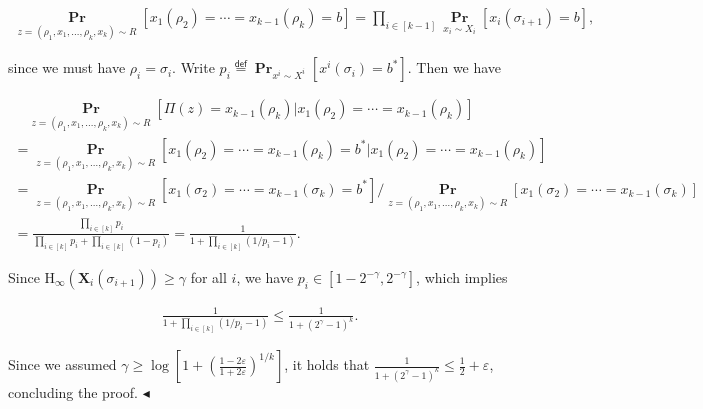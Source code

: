 \[\begin{gathered}
\operatorname*{\mathbf{Pr}}_{z=(\rho_{1},x_{1},\dots,\rho_{k},x_{k})\sim R}\left[x_{1}(\rho_{2})=\cdots=x_{k-1}(\rho_{k})=b\right]=\prod_{i\in[k-1]}\operatorname*{\mathbf{Pr}}_{x_{i}\sim X_{i}}\left[x_{i}(\sigma_{i+1})=b\right],
\end{gathered}\]


since we must have $\rho_{i}=\sigma_{i}$.
Write $p_{i}\stackrel{{\scriptstyle\mathsf{def}}}{{=}}\operatorname*{\mathbf{Pr}}_{x^{i}\sim X^{i}}\left[x^{i}(\sigma_{i})=b^{*}\right]$.
Then we have\par




\[\begin{gathered}
\displaystyle\quad\operatorname*{\mathbf{Pr}}_{z=(\rho_{1},x_{1},\dots,\rho_{k},x_{k})\sim R}\left[\Pi(z)=x_{k-1}(\rho_{k})|x_{1}(\rho_{2})=\cdots=x_{k-1}(\rho_{k})\right] \\
\displaystyle=\operatorname*{\mathbf{Pr}}_{z=(\rho_{1},x_{1},\dots,\rho_{k},x_{k})\sim R}\left[x_{1}(\rho_{2})=\cdots=x_{k-1}(\rho_{k})=b^{*}|x_{1}(\rho_{2})=\cdots=x_{k-1}(\rho_{k})\right] \\
\displaystyle=\operatorname*{\mathbf{Pr}}_{z=(\rho_{1},x_{1},\dots,\rho_{k},x_{k})\sim R}\left[x_{1}(\sigma_{2})=\cdots=x_{k-1}(\sigma_{k})=b^{*}\right]/\operatorname*{\mathbf{Pr}}_{z=(\rho_{1},x_{1},\dots,\rho_{k},x_{k})\sim R}\left[x_{1}(\sigma_{2})=\cdots=x_{k-1}(\sigma_{k})\right] \\
\displaystyle=\frac{\prod_{i\in[k]}p_{i}}{\prod_{i\in[k]}p_{i}+\prod_{i\in[k]}(1-p_{i})}=\frac{1}{1+\prod_{i\in[k]}(1/p_{i}-1)}.
\end{gathered}\]


Since $\text{H}_{\infty}(\bm{X}_{i}(\sigma_{i+1}))\geq\gamma$ for all $i$, we have $p_{i}\in[1-2^{-\gamma},2^{-\gamma}]$, which implies\par


\[\begin{gathered}
\frac{1}{1+\prod_{i\in[k]}(1/p_{i}-1)}\leq\frac{1}{1+(2^{\gamma}-1)^{k}}.
\end{gathered}\]


Since we assumed $\gamma\geq\log\left[1+\left(\frac{1-2\varepsilon}{1+2\varepsilon}\right)^{1/k}\right]$, it holds that $\frac{1}{1+(2^{\gamma}-1)^{k}}\leq\frac{1}{2}+\varepsilon$, concluding the proof.
$\blacktriangleleft$\par






